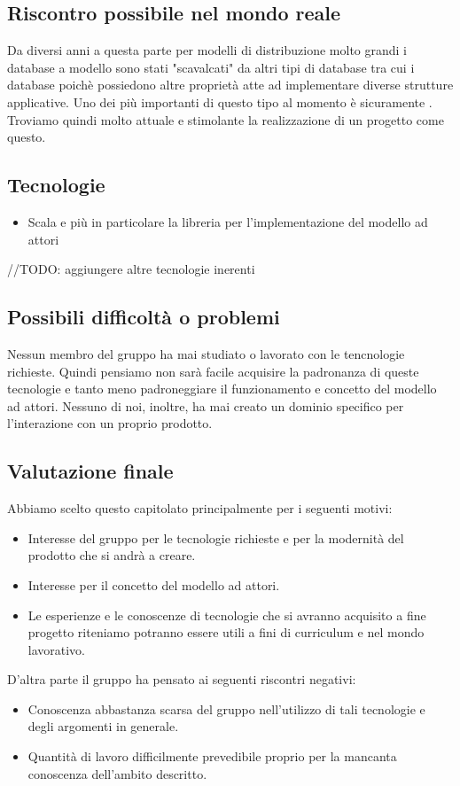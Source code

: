 \documentclass{scalatekids-article}
\begin{document}
\subsection{Riscontro possibile nel mondo reale}
Da diversi anni a questa parte per modelli di distribuzione molto grandi i
database a modello  sono stati "scavalcati" da altri tipi di
database  tra cui i database  poichè possiedono altre
proprietà atte ad implementare diverse strutture applicative. Uno dei più
importanti  di questo tipo al momento è sicuramente .
Troviamo quindi molto attuale e stimolante la realizzazione di un progetto come
questo.

\subsection{Tecnologie}
\begin{itemize}
\item Scala e più in particolare la libreria  per l'implementazione del modello ad attori
\end{itemize}
//TODO: aggiungere altre tecnologie inerenti

\subsection{Possibili difficoltà o problemi}
Nessun membro del gruppo ha mai studiato o lavorato con le tencnologie
richieste. Quindi pensiamo non sarà facile acquisire la padronanza di queste tecnologie e tanto meno padroneggiare il
funzionamento e concetto del modello ad attori. Nessuno di noi, inoltre, ha mai
creato un dominio specifico per l'interazione con un proprio prodotto.

\subsection{Valutazione finale}
Abbiamo scelto questo capitolato principalmente per i seguenti motivi:
\begin{itemize}
\item Interesse del gruppo per le tecnologie richieste e per la modernità del prodotto che si andrà a creare.
\item Interesse per il concetto del modello ad attori.
\item Le esperienze e le conoscenze di tecnologie che si avranno acquisito a fine progetto riteniamo potranno essere utili a fini di curriculum e nel mondo lavorativo.
\end{itemize}
D'altra parte il gruppo ha pensato ai seguenti riscontri negativi:
\begin{itemize}
\item Conoscenza abbastanza scarsa del gruppo nell'utilizzo di tali tecnologie e degli argomenti in generale.
\item Quantità di lavoro difficilmente prevedibile proprio per la mancanta conoscenza dell'ambito descritto.
\end{itemize}
\end{document}
